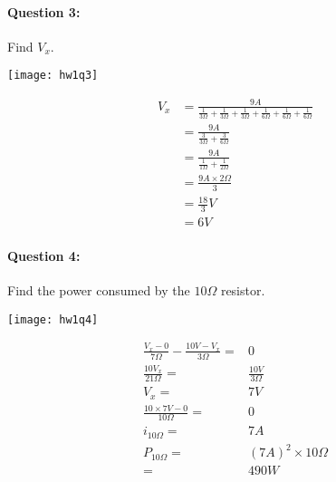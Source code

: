 \documentclass[12pt,letterpaper,titlepage]{article}
\begin{document}
\begin{raggedright}
\clearpage

\paragraph{Question 3: }

Find $V_x$.

\begin{center}
\texttt{[image: hw1q3]}
\end{center}

\begin{align*}
 V_x &= \frac{9A}{\frac{1}{3\Omega}+\frac{1}{3\Omega}+\frac{1}{3\Omega}+\frac{1}{6\Omega}+\frac{1}{6\Omega}+\frac{1}{6\Omega}}
\\   &= \frac{9A}{\frac{3}{3\Omega}+\frac{3}{6\Omega}}
\\   &= \frac{9A}{\frac{1}{1\Omega}+\frac{1}{2\Omega}}
\\   &= \frac{9A \times 2\Omega}{3}
\\   &= \frac{18}{3}V
\\   &= 6V
\end{align*}

\clearpage

\paragraph{Question 4: }

Find the power consumed by the $10\Omega$ resistor.

\begin{center}
\texttt{[image: hw1q4]}
\end{center}

\begin{align*}
    \frac{V_x-0}{7\Omega}-\frac{10V-V_x}{3\Omega}=&0
\\  \frac{10V_x}{21\Omega}=& \frac{10V}{3\Omega}
\\  V_x =& 7V
\\  \frac{10\times7V - 0}{10\Omega} =& 0
\\  i_{10\Omega} =& 7A
\\  P_{10\Omega} =& (7A)^2\times 10\Omega
\\   =& 490W
\end{align*}

\end{raggedright}
\end{document}
